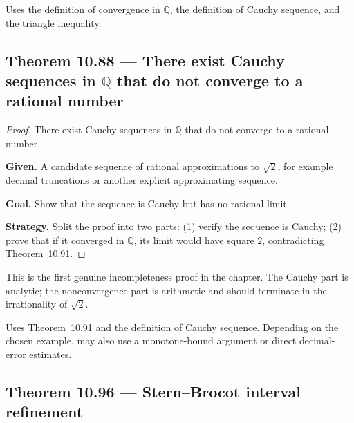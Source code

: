 \begin{remark*}[Dependencies]
Uses the definition of convergence in $\mathbb{Q}$, the definition of Cauchy
sequence, and the triangle inequality.
\end{remark*}


\subsection*{Theorem 10.88 — There exist Cauchy sequences in $\mathbb{Q}$ that do not converge to a rational number}
\label{prf:grep-cauchy-not-convergent-in-q}

\begin{proof}
\Claim There exist Cauchy sequences in $\mathbb{Q}$ that do not converge to a rational number.

\textbf{Given.} A candidate sequence of rational approximations to $\sqrt{2}$, for example decimal truncations or another explicit approximating sequence.

\textbf{Goal.} Show that the sequence is Cauchy but has no rational limit.

\textbf{Strategy.} Split the proof into two parts: (1) verify the sequence is Cauchy; (2) prove that if it converged in $\mathbb{Q}$, its limit would have square $2$, contradicting Theorem~10.91.


\end{proof}

\begin{remark*}
This is the first genuine incompleteness proof in the chapter.  The Cauchy part
is analytic; the nonconvergence part is arithmetic and should terminate in the
irrationality of $\sqrt{2}$.
\end{remark*}

\begin{remark*}[Dependencies]
Uses Theorem~10.91 and the definition of Cauchy sequence.  Depending on the
chosen example, may also use a monotone-bound argument or direct decimal-error
estimates.
\end{remark*}


\subsection*{Theorem 10.96 — Stern--Brocot interval refinement}
\label{prf:grep-stern-brocot-interval-refinement}

